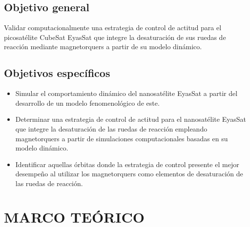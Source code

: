 \subsection{Objetivo general}



Validar computacionalmente una estrategia de control de actitud para el picosatélite CubeSat EyasSat que integre la desaturación de sus ruedas de reacción mediante magnetorquers a partir de su modelo dinámico.

\subsection{Objetivos específicos}

\begin{itemize}
\item Simular el comportamiento dinámico del nanosatélite EyasSat a partir del desarrollo de un modelo fenomenológico de este.
\item Determinar una estrategia de control de actitud para el nanosatélite EyasSat que integre la desaturación de las ruedas de reacción empleando magnetorquers a partir de simulaciones computacionales basadas en su modelo dinámico. 
\item Identificar aquellas órbitas donde la estrategia de control presente el mejor desempeño al utilizar los magnetorquers como elementos de desaturación de las ruedas de reacción.

\end{itemize}


\newpage
%

\newpage
\section{MARCO TEÓRICO}

